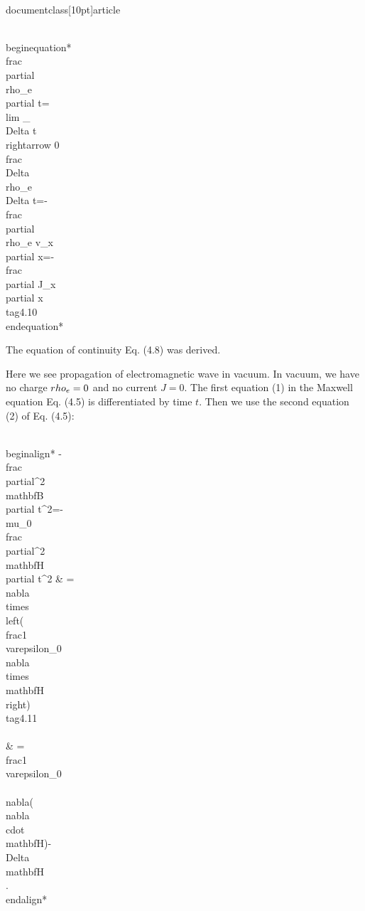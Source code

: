 \\documentclass[10pt]{article}
\begin{document}
\\begin{equation*}
\\frac{\\partial \\rho_{e}}{\\partial t}=\\lim _{\\Delta t \\rightarrow 0} \\frac{\\Delta \\rho_{e}}{\\Delta t}=-\\frac{\\partial \\rho_{e} v_{x}}{\\partial x}=-\\frac{\\partial J_{x}}{\\partial x} \\tag{4.10}
\\end{equation*}


The equation of continuity Eq. (4.8) was derived.

Here we see propagation of electromagnetic wave in vacuum. In vacuum, we have no charge $\\rho_{e}=0$ and no current $J=0$. The first equation (1) in the Maxwell equation Eq. (4.5) is differentiated by time $t$. Then we use the second equation (2) of Eq. (4.5):


\\begin{align*}
-\\frac{\\partial^{2} \\mathbf{B}}{\\partial t^{2}}=-\\mu_{0} \\frac{\\partial^{2} \\mathbf{H}}{\\partial t^{2}} & =\\nabla \\times\\left(\\frac{1}{\\varepsilon_{0}} \\nabla \\times \\mathbf{H}\\right)  \\tag{4.11}\\\\
& =\\frac{1}{\\varepsilon_{0}}\\{\\nabla(\\nabla \\cdot \\mathbf{H})-\\Delta \\mathbf{H}\\} .
\\end{align*}
\end{document}
